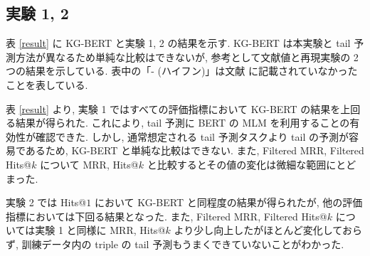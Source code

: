 \documentclass[twocolumn]{jarticle}
\begin{document}
\vspace{-1mm}
\subsection{実験 1, 2}

表 \ref{result} に KG-BERT と実験 1, 2 の結果を示す. KG-BERT は本実験と tail 予測方法が異なるため単純な比較はできないが, 参考として文献値と再現実験の 2 つの結果を示している. 表中の「- (ハイフン)」は文献 \cite{KG-BERT} に記載されていなかったことを表している. \par

\begin{table}[t]
    \centering
    \caption{KG-BERT と実験 1, 2 の結果}
    \vspace{-3mm}
    \label{result}
\end{table}

表 \ref{result} より, 実験 1 ではすべての評価指標において KG-BERT の結果を上回る結果が得られた. これにより, tail 予測に BERT の MLM を利用することの有効性が確認できた. しかし, 通常想定される tail 予測タスクより tail の予測が容易であるため, KG-BERT と単純な比較はできない. また, Filtered MRR, Filtered Hits@$k$ について MRR, Hits@$k$ と比較するとその値の変化は微細な範囲にとどまった. \par
実験 2 では Hits@$1$ において KG-BERT と同程度の結果が得られたが, 他の評価指標においては下回る結果となった. また, Filtered MRR, Filtered Hits@$k$ については実験 1 と同様に MRR, Hits@$k$ より少し向上したがほとんど変化しておらず, 訓練データ内の triple の tail 予測もうまくできていないことがわかった. \par

\vspace{-1mm}
\end{document}
